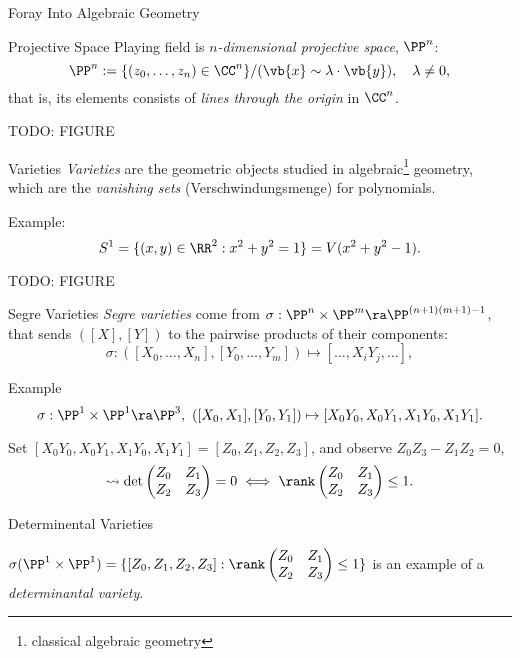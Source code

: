\begin{frame}{Foray Into Algebraic Geometry}
    \begin{block}{Projective Space}
    Playing field is $n$\emph{-dimensional projective space}, $\PP^{n}$:
        $$ \PP^{n} := \{ (z_{0}, \ldots, z_{n}) \in \CC^{n} \} / (\vb{x} \sim \lambda \cdot \vb{y}), \quad \lambda \neq 0, $$
    that is, its elements consists of \emph{lines through the origin} in $\CC^{n}$.
    \end{block}
    
    TODO: FIGURE
\end{frame}

\begin{frame}{Varieties}
        \emph{Varieties} are the geometric objects studied in algebraic\footnote{classical algebraic geometry} geometry, which are the \emph{vanishing sets} (Verschwindungsmenge) for polynomials.

        Example:
        $$ S^{1} = \{ (x,y) \in \RR^{2} : x^{2} + y^{2} = 1 \} = V( x^{2} + y^{2} - 1 ). $$

    TODO: FIGURE
\end{frame}

\begin{frame}{Segre Varieties}
        \emph{Segre varieties} come from $\sigma: \PP^{n} \times \PP^{m} \ra \PP^{(n+1)(m+1) - 1}$, that sends $([X],[Y])$ to the pairwise products of their components:
            $$ \sigma : ([X_{0}, \ldots, X_{n}], [Y_{0}, \ldots, Y_{m}]) \mapsto [\ldots, X_{i}Y_{j}, \ldots ], $$

        \begin{block}{Example}
        $$\sigma : \PP^{1} \times \PP^{1} \ra \PP^{3},\ ([X_{0}, X_{1}], [Y_{0}, Y_{1}]) \mapsto [ X_{0}Y_{0}, X_{0}Y_{1}, X_{1}Y_{0}, X_{1}Y_{1} ].  $$
        
        Set $[ X_{0}Y_{0}, X_{0}Y_{1}, X_{1}Y_{0}, X_{1}Y_{1} ] = [Z_{0}, Z_{1}, Z_{2}, Z_{3}]$, and observe $Z_{0}Z_{3} - Z_{1}Z_{2} = 0$,
        $$ \rightsquigarrow \det \begin{pmatrix} Z_{0} & Z_{1} \\ Z_{2} & Z_{3} \end{pmatrix} = 0 \iff \rank \begin{pmatrix} Z_{0} & Z_{1} \\ Z_{2} & Z_{3} \end{pmatrix} \leq 1. $$
        \end{block}
\end{frame}

\begin{frame}{Determinental Varieties}
        
    $\sigma(\PP^{1} \times \PP^{1}) = \{ [Z_{0}, Z_{1}, Z_{2}, Z_{3}] : \rank \begin{pmatrix} Z_{0} & Z_{1} \\ Z_{2} & Z_{3} \end{pmatrix} \leq 1 \} $ is an example of a \emph{determinantal variety}.

     

\end{frame}